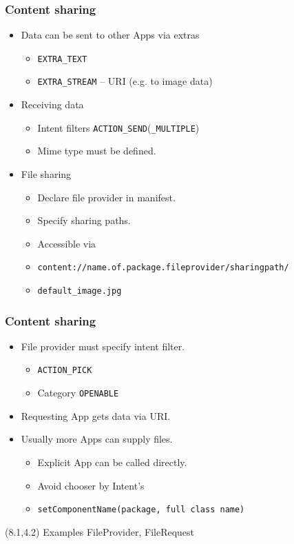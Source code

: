 \documentclass[10pt,xcolor=pdflatex]{beamer}
\begin{document}
\begin{frame}[fragile]\frametitle{Content sharing}
\begin{itemize}
	\item Data can be sent to other Apps via extras
	  \begin{itemize}
		\item \texttt{EXTRA\_TEXT}
		\item \texttt{EXTRA\_STREAM} -- URI (e.g. to image data)
	  \end{itemize}
    \item Receiving data
	  \begin{itemize}
		\item Intent filters  \texttt{ACTION\_SEND}(\texttt{\_MULTIPLE})
		\item Mime type must be defined.
	  \end{itemize}
    \item File sharing
	  \begin{itemize}
		\item Declare file provider in manifest.
		\item Specify sharing paths.
		\item Accessible via
        \item[] \begin{footnotesize}\verb;content://name.of.package.fileprovider/sharingpath/; \end{footnotesize}
        \item[] \begin{footnotesize}\verb;default_image.jpg; \end{footnotesize}
	  \end{itemize}
\end{itemize}
\end{frame}


\begin{frame}[fragile]\frametitle{Content sharing}
\begin{itemize}
	\item File provider must specify intent filter.
	  \begin{itemize}
		\item \texttt{ACTION\_PICK}
		\item Category \texttt{OPENABLE}
      \end{itemize}
    \item Requesting App gets data via URI.
	\item Usually more Apps can supply files.
      \begin{itemize}
        \item Explicit App can be called directly.
	    \item Avoid chooser by Intent's 
        \item[] \texttt{setComponentName(package, full class name)}
      \end{itemize}
\end{itemize}
\begin{textblock}{15}(8.1,4.2)
    {\footnotesize Examples FileProvider, FileRequest}
\end{textblock}
\end{frame}
\end{document}
